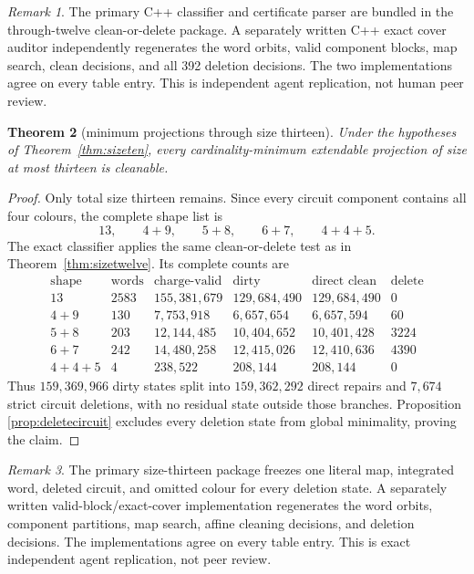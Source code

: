 \documentclass[11pt]{article}
\newtheorem{theorem}{Theorem}[section]
\theoremstyle{definition}
\theoremstyle{remark}
\newtheorem{remark}[theorem]{Remark}
\begin{document}
\begin{remark}
The primary C++ classifier and certificate parser are bundled in the
through-twelve clean-or-delete package.  A separately written C++ exact
cover auditor independently regenerates the word orbits, valid component
blocks, map search, clean decisions, and all 392 deletion decisions.  The
two implementations agree on every table entry.  This is independent
agent replication, not human peer review.
\end{remark}

\begin{theorem}[minimum projections through size thirteen]
\label{thm:sizethirteen}
Under the hypotheses of Theorem~\ref{thm:sizeten}, every
cardinality-minimum extendable projection of size at most thirteen is
cleanable.
\end{theorem}

\begin{proof}
Only total size thirteen remains.  Since every circuit component contains
all four colours, the complete shape list is
\[
                13,\qquad4+9,\qquad5+8,\qquad6+7,\qquad4+4+5. \tag{18}
\]
The exact classifier applies the same clean-or-delete test as in
Theorem~\ref{thm:sizetwelve}.  Its complete counts are
\[
\begin{array}{c|r|r|r|r|r}
\text{shape}&\text{words}&\text{charge-valid}&\text{dirty}&
\text{direct clean}&\text{delete}\\
\hline
13&2583&155{,}381{,}679&129{,}684{,}490&129{,}684{,}490&0\\
4+9&130&7{,}753{,}918&6{,}657{,}654&6{,}657{,}594&60\\
5+8&203&12{,}144{,}485&10{,}404{,}652&10{,}401{,}428&3224\\
6+7&242&14{,}480{,}258&12{,}415{,}026&12{,}410{,}636&4390\\
4+4+5&4&238{,}522&208{,}144&208{,}144&0
\end{array}
\]
Thus \(159{,}369{,}966\) dirty states split into
\(159{,}362{,}292\) direct repairs and \(7{,}674\) strict circuit
deletions, with no residual state outside those branches.  Proposition
\ref{prop:deletecircuit} excludes every deletion state from global
minimality, proving the claim.
\end{proof}

\begin{remark}
The primary size-thirteen package freezes one literal map, integrated
word, deleted circuit, and omitted colour for every deletion state.
A separately written valid-block/exact-cover implementation regenerates
the word orbits, component partitions, map search, affine cleaning
decisions, and deletion decisions.  The implementations agree on every
table entry.  This is exact independent agent replication, not peer review.
\end{remark}
\end{document}
